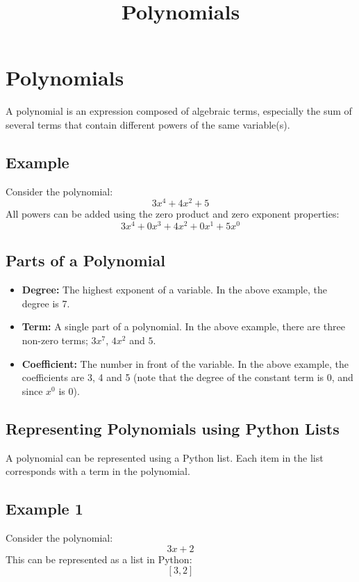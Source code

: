 \documentclass{article}
\title{Polynomials}
\author{}
\date{}
\begin{document}
\maketitle

\section*{Polynomials}

A polynomial is an expression composed of algebraic terms, especially the sum of several terms that contain different powers of the same variable(s).

\subsection*{Example}
Consider the polynomial:
$$ 3x^4 + 4x^2 + 5 $$
All powers can be added using the zero product and zero exponent properties:
$$ 3x^4 + 0x^3 + 4x^2 + 0x^1 + 5x^0 $$

\subsection*{Parts of a Polynomial}
\begin{itemize}
  \item \textbf{Degree:} The highest exponent of a variable. In the above example, the degree is 7.
  \item \textbf{Term:} A single part of a polynomial. In the above example, there are three non-zero terms; \( 3x^7 \), \( 4x^2 \) and \( 5 \).
  \item \textbf{Coefficient:} The number in front of the variable. In the above example, the coefficients are 3, 4 and 5 (note that the degree of the constant term is 0, and since \(x^0\) is 0).
\end{itemize}

\subsection*{Representing Polynomials using Python Lists}

A polynomial can be represented using a Python list. Each item in the list corresponds with a term in the polynomial.

\subsection*{Example 1}
Consider the polynomial:
$$ 3x + 2 $$
This can be represented as a list in Python:
$$[3, 2] $$
\end{document}
